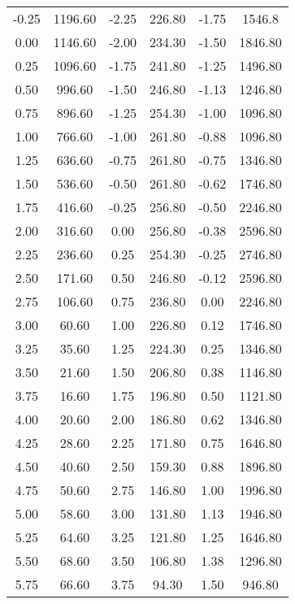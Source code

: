 \begin{longtable}{S[table-format=3.2] S[table-format=3.2] S[table-format=3.2] S[table-format=3.2] S[table-format=3.2] S[table-format=3.2]}
                -0.25 & 1196.60 & -2.25 & 226.80 & -1.75 & 1546.8\\
                0.00 & 1146.60 & -2.00 & 234.30 & -1.50 & 1846.80\\
                0.25 & 1096.60 & -1.75 & 241.80 & -1.25 & 1496.80\\
                0.50 & 996.60 & -1.50 & 246.80 & -1.13 & 1246.80\\
                0.75 & 896.60 & -1.25 & 254.30 & -1.00 & 1096.80\\
                1.00 & 766.60 & -1.00 & 261.80 & -0.88 & 1096.80\\
                1.25 & 636.60 & -0.75 & 261.80 & -0.75 & 1346.80\\
                1.50 & 536.60 & -0.50 & 261.80 & -0.62 & 1746.80\\
                1.75 & 416.60 & -0.25 & 256.80 & -0.50 & 2246.80\\
                2.00 & 316.60 & 0.00 & 256.80 & -0.38 & 2596.80\\
                2.25 & 236.60 & 0.25 & 254.30 & -0.25 & 2746.80\\
                2.50 & 171.60 & 0.50 & 246.80 & -0.12 & 2596.80\\
                2.75 & 106.60 & 0.75 & 236.80 & 0.00 & 2246.80\\
                3.00 & 60.60 & 1.00 & 226.80 & 0.12 & 1746.80\\
                3.25 & 35.60 & 1.25 & 224.30 & 0.25 & 1346.80\\
                3.50 & 21.60 & 1.50 & 206.80 & 0.38 & 1146.80\\
                3.75 & 16.60 & 1.75 & 196.80 & 0.50 & 1121.80\\
                4.00 & 20.60 & 2.00 & 186.80 & 0.62 & 1346.80\\
                4.25 & 28.60 & 2.25 & 171.80 & 0.75 & 1646.80\\
                4.50 & 40.60 & 2.50 & 159.30 & 0.88 & 1896.80\\
                4.75 & 50.60 & 2.75 & 146.80 & 1.00 & 1996.80\\
                5.00 & 58.60 & 3.00 & 131.80 & 1.13 & 1946.80\\
                5.25 & 64.60 & 3.25 & 121.80 & 1.25 & 1646.80\\
                5.50 & 68.60 & 3.50 & 106.80 & 1.38 & 1296.80\\
                5.75 & 66.60 & 3.75 & 94.30 & 1.50 & 946.80\\

\end{longtable}
